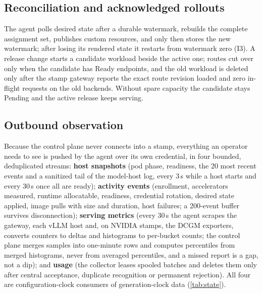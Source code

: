 \documentclass[conference,letterpaper]{IEEEtran}
\begin{document}
\subsection{Reconciliation and acknowledged rollouts}
The agent polls desired state after a durable watermark, rebuilds the complete assignment
set, publishes custom resources, and only then stores the new watermark; after losing its
rendered state it restarts from watermark zero (I3). A release change starts a candidate
workload beside the active one; routes cut over only when the candidate has Ready endpoints,
and the old workload is deleted only after the stamp gateway reports the exact route revision
loaded and zero in-flight requests on the old backends. Without spare capacity the candidate
stays Pending and the active release keeps serving.

\subsection{Outbound observation}
\label{sec:observe}
Because the control plane never connects into a stamp, everything an operator needs to see is
pushed by the agent over its own credential, in four bounded, deduplicated streams:
\textbf{host snapshots} (pod phase, readiness, the 20 most recent events and a sanitized tail
of the model-host log, every 3\,s while a host starts and every 30\,s once all are ready);
\textbf{activity events} (enrollment, accelerators measured, runtime allocatable, readiness,
credential rotation, desired state applied, image pulls with size and duration, host
failures; a 200-event buffer survives disconnection); \textbf{serving metrics} (every 30\,s
the agent scrapes the gateway, each vLLM host and, on NVIDIA stamps, the DCGM exporters,
converts counters to deltas and histograms to per-bucket counts; the control plane merges
samples into one-minute rows and computes percentiles from merged histograms, never from
averaged percentiles, and a missed report is a gap, not a dip); and \textbf{usage} (the
collector leases spooled batches and deletes them only after central acceptance, duplicate
recognition or permanent rejection). All four are configuration-clock consumers of
generation-clock data (\cref{tab:state}).
\end{document}
